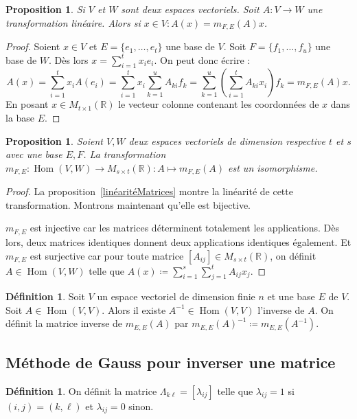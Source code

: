 \documentclass{article}
\DeclareMathOperator{\Hom}{Hom}
\newcommand{\R}{\mathbb R}
\newcommand{\M}[3]{M_{#1 \times #2}(#3)}
\newtheorem{prp}[thm]{Proposition}
\theoremstyle{definition}
\newtheorem{déf}[thm]{Définition}
\theoremstyle{remark}
\begin{document}
		\begin{prp} Si $V$ et $W$ sont deux espaces vectoriels. Soit $A : V \to W$ une transformation linéaire. Alors si $x \in V : A(x) = m_{F, E}(A)x$. \end{prp}

		\begin{proof} Soient $x \in V$ et $E = \{e_1, \ldots, e_t\}$ une base de $V$. Soit $F = \{f_1, \ldots, f_u\}$ une base de $W$. Dès lors
		$x = \sum_{i=1}^tx_ie_i$. On peut donc écrire :
		\[A(x) = \sum_{i=1}^tx_iA(e_i) = \sum_{i=1}^tx_i\sum_{k=1}^uA_{ki}f_k = \sum_{k=1}^u\left(\sum_{i=1}^tA_{ki}x_i\right)f_k = m_{F, E}(A)x.\]
		En posant $x \in \M t1\R$ le vecteur colonne contenant les coordonnées de $x$ dans la base $E$. \end{proof}

		\begin{prp} Soient $V, W$ deux espaces vectoriels de dimension respective $t$ et $s$ avec une base $E, F$. La transformation
		$m_{F, E} : \Hom(V, W) \to \M st\R : A \mapsto m_{F, E}(A)$ est un isomorphisme. \end{prp}

		\begin{proof} La proposition~\ref{linéaritéMatrices} montre la linéarité de cette transformation. Montrons maintenant qu'elle est bijective.

		$m_{F, E}$ est injective car les matrices déterminent totalement les applications. Dès lors, deux matrices identiques donnent deux applications identiques également.
		Et $m_{F, E}$ est surjective car pour toute matrice $[A_{ij}] \in \M st\R$, on définit $A \in \Hom(V, W)$ telle que
		$A(x) \coloneqq \sum_{i=1}^s\sum_{j=1}^tA_{ij}x_j$. \end{proof}

		\begin{déf} Soit $V$ un espace vectoriel de dimension finie $n$ et une base $E$ de $V$. Soit $A \in \Hom(V, V)$. Alors il existe $A^{-1} \in \Hom(V, V)$ l'inverse
		de $A$. On définit la matrice inverse de $m_{E, E}(A)$ par $m_{E, E}(A)^{-1} \coloneqq m_{E, E}(A^{-1})$. \end{déf}

	\subsection{Méthode de Gauss pour inverser une matrice}
		\begin{déf} On définit la matrice $\Lambda_{k\ell} = [\lambda_{ij}]$ telle que $\lambda_{ij} = 1$ si $(i, j) = (k, \ell)$ et $\lambda_{ij} = 0$ sinon. \end{déf}
\end{document}
